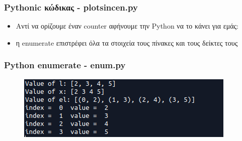 \documentclass[9pt]{beamer}
\begin{document}
	\begin{frame}
		\frametitle{Pythonic κώδικας - plotsincen.py}
		
			\begin{itemize}
			\item Αντί να ορίζουμε έναν counter αφήνουμε την Python να το κάνει για εμάς:
			\item η enumerate επιστρέφει όλα τα στοιχεία τους πίνακες και τους δείκτες τους					
		\end{itemize}		
	\end{frame}

	\begin{frame}
	\frametitle{Python enumerate - enum.py}
	
	\begin{figure}
	\includegraphics[width=0.7\linewidth]{enumout}
	\end{figure}
	\end{frame}
\end{document}
